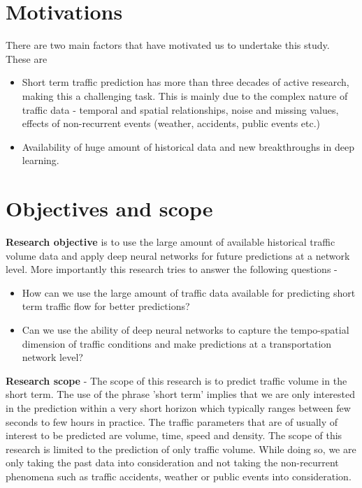 \section{Motivations}
There are two main factors that have motivated us to undertake this study. These are

\begin{itemize}
\item Short term traffic prediction has more than three decades of active research, making this a
challenging task. This is mainly due to the complex nature of traffic data - temporal and spatial
relationships, noise and missing values, effects of non-recurrent events (weather, accidents,
public events etc.)

\item Availability of huge amount of historical data and new breakthroughs in deep learning.

\end{itemize}

\section{Objectives and scope}

\textbf{Research objective} is to use the large amount of available historical traffic volume data and
apply deep neural networks for future predictions at a network level. More importantly this research
tries to answer the following questions -

\begin{itemize}
\item How can we use the large amount of traffic data available for predicting short term traffic
 flow for better predictions?
\item Can we use the ability of deep neural networks to capture the tempo-spatial dimension of
traffic conditions and make predictions at a transportation network level?
\end{itemize}

\textbf{Research scope} - The scope of this research is to predict traffic volume in the
short term. The use of the phrase 'short term' implies that we are only interested in the
prediction within a very short horizon which typically ranges between few seconds to few
hours in practice. The traffic parameters that are of usually of interest to be predicted are
volume, time, speed and density. The scope of this research is limited to the prediction of only
traffic volume. While doing so, we are only taking the past data into consideration and not
taking the non-recurrent phenomena such as traffic accidents, weather or public events into
consideration.


